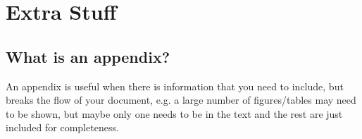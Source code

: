 \documentclass[a4paper,twoside,12pt]{report}
\begin{document}
\appendix
\chapter{Extra Stuff}\label{app:extra}
\section{What is an appendix?}\label{app:whatis}

An appendix is useful when there is information that you need to include, but breaks the flow of your document, e.g. a large number of figures/tables may need to be shown, but maybe only one needs to be in the text and the rest are just included for completeness.

\nocite{*}


\end{document}
